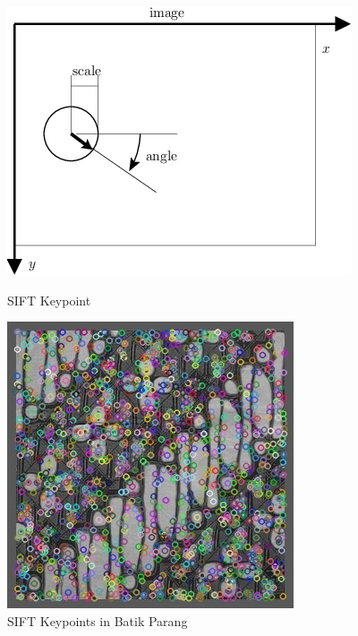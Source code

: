 \documentclass[10pt]{beamer}
\begin{document}
\begin{frame}{\cite{lowe2004distinctive}}

	\begin{figure}
        \centering
        \begin{minipage}{.5\textwidth}
            \centering
            \includegraphics[width=.9\linewidth]{sift-keypoint}
            \caption{SIFT Keypoint}
            \label{fig_keypoint}
        \end{minipage}%
        \begin{minipage}{.5\textwidth}
            \centering
            \includegraphics[width=.8\linewidth]{batik-parang-keypoints}
            \caption{SIFT Keypoints in Batik Parang}
            \label{fig_batik_parang_keypoints}
        \end{minipage}
    \end{figure}

\end{frame}
\end{document}
